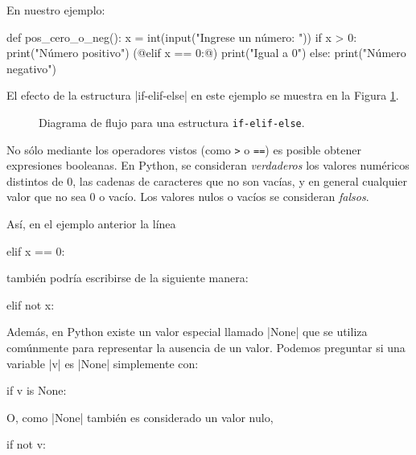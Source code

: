 En nuestro ejemplo:
\begin{codigo-python-sn}
def pos_cero_o_neg():
    x = int(input("Ingrese un número: "))
    if x > 0:
       print("Número positivo")
    (@elif x == 0:@)
       print("Igual a 0")
    else:
       print("Número negativo")
\end{codigo-python-sn}

El efecto de la estructura |if-elif-else| en este ejemplo se muestra en la
Figura \ref{flujo-if-elif-else}.

\begin{figure}[hbt]
\caption{Diagrama de flujo para una estructura \texttt{if-elif-else}.}
\label{flujo-if-elif-else}
\end{figure}

\begin{sabias_que}
No sólo mediante los operadores vistos (como \lstinline!>! o \lstinline!==!)
es posible obtener expresiones booleanas.  En Python, se consideran
\textit{verdaderos} los valores numéricos distintos de 0, las cadenas de
caracteres que no son vacías, y en general cualquier valor que no sea 0 o
vacío.  Los valores nulos o vacíos se consideran \textit{falsos}.

Así, en el ejemplo anterior la línea
\begin{codigo-python-sn}
elif x == 0:
\end{codigo-python-sn}
también podría escribirse de la siguiente manera:
\begin{codigo-python-sn}
elif not x:
\end{codigo-python-sn}

Además, en Python existe un valor especial llamado |None| que se utiliza
comúnmente para representar la ausencia de un valor. Podemos preguntar si una
variable |v| es |None| simplemente con:
\begin{codigo-python-sn}
if v is None:
\end{codigo-python-sn}

O, como |None| también es considerado un valor nulo,
\begin{codigo-python-sn}
if not v:
\end{codigo-python-sn}
\end{sabias_que}

